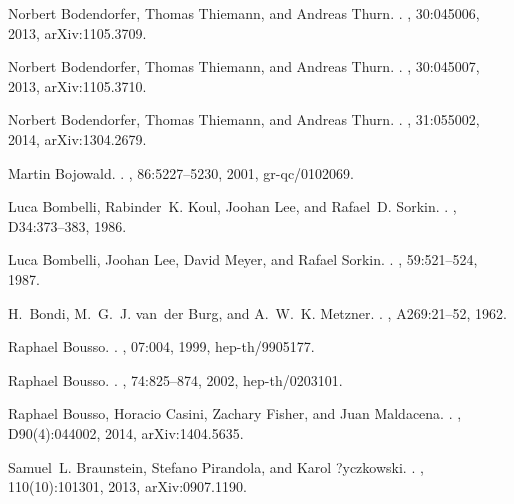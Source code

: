 \documentclass[aps, nofootinbib,superscriptaddress,12pt]{revtex4-2}
\begin{document}
\begin{thebibliography}{100}
Norbert Bodendorfer, Thomas Thiemann, and Andreas Thurn.
.
, 30:045006, 2013, arXiv:1105.3709.

Norbert Bodendorfer, Thomas Thiemann, and Andreas Thurn.
.
, 30:045007, 2013, arXiv:1105.3710.

Norbert Bodendorfer, Thomas Thiemann, and Andreas Thurn.
.
, 31:055002, 2014, arXiv:1304.2679.

Martin Bojowald.
.
, 86:5227--5230, 2001, gr-qc/0102069.

Luca Bombelli, Rabinder~K. Koul, Joohan Lee, and Rafael~D. Sorkin.
.
, D34:373--383, 1986.

Luca Bombelli, Joohan Lee, David Meyer, and Rafael Sorkin.
.
, 59:521--524, 1987.

H.~Bondi, M.~G.~J. van~der Burg, and A.~W.~K. Metzner.
.
, A269:21--52, 1962.

Raphael Bousso.
.
, 07:004, 1999, hep-th/9905177.

Raphael Bousso.
.
, 74:825--874, 2002, hep-th/0203101.

Raphael Bousso, Horacio Casini, Zachary Fisher, and Juan Maldacena.
.
, D90(4):044002, 2014, arXiv:1404.5635.

Samuel~L. Braunstein, Stefano Pirandola, and Karol ?yczkowski.
.
, 110(10):101301, 2013, arXiv:0907.1190.


\end{thebibliography}
\end{document}
